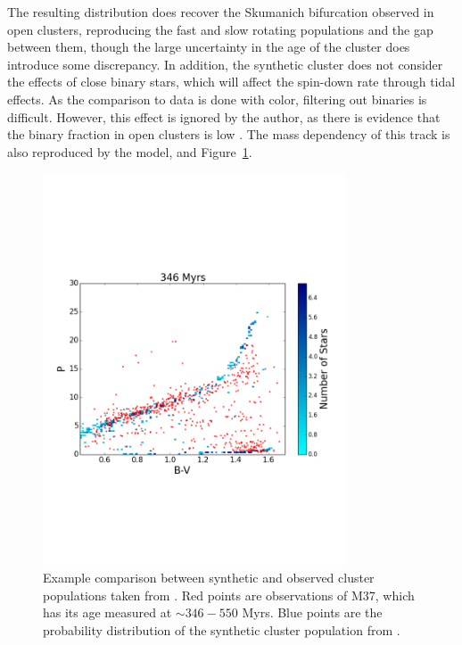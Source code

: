 The resulting distribution does recover the Skumanich bifurcation observed in open clusters, reproducing the fast and slow rotating populations and the gap between them, though the large uncertainty in the age of the cluster does introduce some discrepancy. 
In addition, the synthetic cluster does not consider the effects of close binary stars, which will affect the spin-down rate through tidal effects. As the comparison to data is done with color, filtering out binaries is difficult. However, this effect is ignored by the author, as there is evidence that the binary fraction in open clusters is low \citep{meibom2007}.
The mass dependency of this track is also reproduced by the model, and Figure~\ref{fig:introduction:garraffo 2018a fig 4}.

\begin{figure}
    \centering
    \includegraphics[width=0.8\textwidth, trim={0 5cm 0 5cm}]{figures/introduction/garraffo2018_M37_346_hPer.pdf}
    \caption{Example comparison between synthetic and observed cluster populations taken from \citet{garraffo2018a}. Red points are observations of M37, which has its age measured at $\sim 346 - 550$ Myrs. Blue points are the probability distribution of the synthetic cluster population from \citet{garraffo2018a}.}
    \label{fig:introduction:garraffo 2018a fig 4}
\end{figure}

